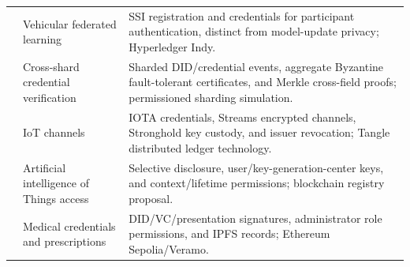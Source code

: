\begin{longtable}{@{}>{\raggedright\arraybackslash}m{}>{\raggedright\arraybackslash}m{}>{\raggedright\arraybackslash}m{}@{}}
\addlinespace[5pt]
\cite{updateZeydan2024SSI} & Vehicular federated learning & SSI registration and credentials for participant authentication, distinct from model-update privacy; Hyperledger Indy. \\
\addlinespace[5pt]
\cite{updateLiu2024SSDID} & Cross-shard credential verification & Sharded DID/credential events, aggregate Byzantine fault-tolerant certificates, and Merkle cross-field proofs; permissioned sharding simulation. \\
\addlinespace[5pt]
\cite{updateRamirez2025IOTAIdentity} & IoT channels & IOTA credentials, Streams encrypted channels, Stronghold key custody, and issuer revocation; Tangle distributed ledger technology. \\
\addlinespace[5pt]
\cite{updateRen2025AIoTIdentity} & Artificial intelligence of Things access & Selective disclosure, user/key-generation-center keys, and context/lifetime permissions; blockchain registry proposal. \\
\addlinespace[5pt]
\cite{updateSeidi2025HealthcareSSI} & Medical credentials and prescriptions & DID/VC/presentation signatures, administrator role permissions, and IPFS records; Ethereum Sepolia/Veramo. \\
\end{longtable}
